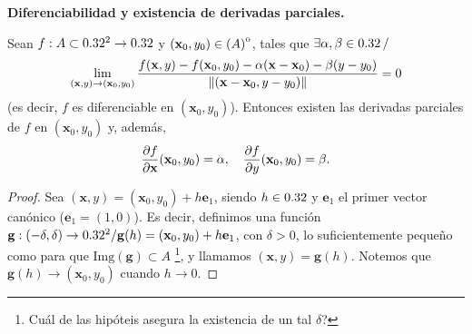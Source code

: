\begin{theorem}\textbf{Diferenciabilidad y existencia de derivadas parciales.} \label{teo:difDer}
\mbox{}

\iffalse
Sean $f: A \subset 0.32^2 \to 0.32$ y $(\mathbf{x}_0, y_0) \in {\kern0pt(A)}^{\mathrm{o}}$, tales que $\exists \alpha, \beta \in 0.32 \, /$
\[
 \lim_{(\mathbf{x},y) \to (\mathbf{x}_0,y_0)} \frac{f(\mathbf{x},y) - f(\mathbf{x}_0,y_0) - \alpha(\mathbf{x} - \mathbf{x}_0) - \beta(y - y_0)}
                                 {\norm{(\mathbf{x} - \mathbf{x}_0, y - y_0)}} = 0
\]
(es decir, $f$ es diferenciable en $(\mathbf{x}_0,y_0)$). Entonces existen las derivadas parciales de $f$ en $(\mathbf{x}_0,y_0)$ y, adem\'as,
\[
 \dfrac{\partial f}{\partial \mathbf{x}} (\mathbf{x}_0,y_0) = \alpha, \quad \dfrac{\partial f}{\partial y}(\mathbf{x}_0,y_0) = \beta.
\]

 \begin{proof}
 \mbox{}
 
Sea $(\mathbf{x},y) = (\mathbf{x}_0,y_0) + h \mathbf{e}_1$, siendo $h \in 0.32$ y $\mathbf{e}_1$ el primer vector can\'onico ($\mathbf{e}_1 = (1,0)$). Es decir, definimos una funci\'on $\mathbf{g}:(-\delta,\delta) \to 0.32^2 / \mathbf{g}(h) = (\mathbf{x}_0,y_0) + h \mathbf{e}_1$, con $\delta > 0$, lo suficientemente peque\~{n}o como para que $\text{Img}(\mathbf{g}) \subset A$ \footnote{Cu\'al de las hip\'oteis asegura la existencia de un tal $\delta$?}, y llamamos $(\mathbf{x},y) = \mathbf{g}(h)$. Notemos que $\mathbf{g}(h) \to (\mathbf{x}_0,y_0)$ cuando $h \to 0$. 


\end{proof}
\end{theorem}
